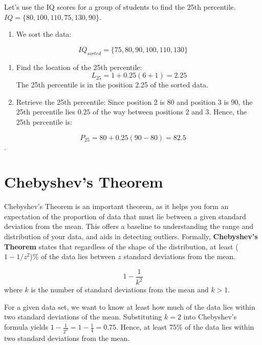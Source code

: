 \documentclass[
  11pt,
  letterpaper,
  DIV=11,
  numbers=noendperiod,
  oneside,
  open=any]{scrreprt}
\providecommand{\tightlist}{%
  \setlength{\itemsep}{0pt}\setlength{\parskip}{0pt}}\usepackage{longtable,booktabs,array}
\begin{document}
\begin{bsexample}[Example]

Let's use the IQ scores for a group of students to find the 25th
percentile. \(IQ=\{80,100,110,75,130,90\}\).

\begin{enumerate}
\def\labelenumi{\arabic{enumi}.}
\tightlist
\item
  We sort the data:
\end{enumerate}

\[IQ_{sorted}=\{75,80,90,100,110,130\}\]

\begin{enumerate}
\def\labelenumi{\arabic{enumi}.}
\setcounter{enumi}{1}
\item
  Find the location of the 25th percentile: \[L_{25}=1+0.25(6+1)=2.25\]
  The 25th percentile is in the position 2.25 of the sorted data.
\item
  Retrieve the 25th percentile: Since position 2 is 80 and position 3 is
  90, the 25th percentile lies \(0.25\) of the way between positions 2
  and 3. Hence, the 25th percentile is:
\end{enumerate}

\[P_{25} = 80 + 0.25(90 - 80) = 82.5\].

\end{bsexample}

\section{Chebyshev's Theorem}\label{chebyshevs-theorem}

Chebyshev's Theorem is an important theorem, as it helps you form an
expectation of the proportion of data that must lie between a given
standard deviation from the mean. This offers a baseline to
understanding the range and distribution of your data, and aids in
detecting outliers. Formally, \textbf{Chebyshev's Theorem} states that
regardless of the shape of the distribution, at least (\(1-1/z^2\))\% of
the data lies between \(z\) standard deviations from the mean.

\begin{bsformula}

\[1 - \frac{1}{k^2}\] where \(k\) is the number of standard deviations
from the mean and \(k > 1\).

\end{bsformula}

\begin{bsexample}[Example 1]

For a given data set, we want to know at least how much of the data lies
within two standard deviations of the mean. Substituting \(k=2\) into
Chebyshev's formula yields \(1-\frac{1}{2^2}=1-\frac{1}{4}=0.75\).
Hence, at least \(75\%\) of the data lies within two standard deviations
from the mean.

\end{bsexample}
\end{document}

